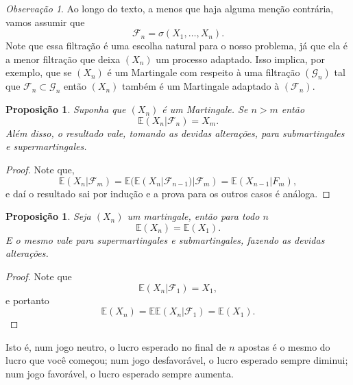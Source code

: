 \documentclass[12pt,a4paper,oneside]{book}
\newtheorem{proposition}[theorem]{Proposi\c{c}\~ao}
\theoremstyle{definition}
\theoremstyle{remark}
\newtheorem{remark}[theorem]{Observa\c{c}\~ao}
\numberwithin{equation}{section}
\newcommand{\E}{\mathbb{E}}
\newcommand{\F}{\mathcal{F}}
\begin{document}
\begin{tcolorbox}[colback= yellow!60]
\begin{remark}
Ao longo do texto, a menos que haja alguma menção contrária, vamos assumir que 
$$\mathcal{F}_n = \sigma(X_1,\dots,X_n).$$
Note que essa filtração é uma escolha natural para o nosso problema, já que ela é a menor filtração que deixa $(X_n)$ um processo adaptado.
Isso implica, por exemplo,  que se $(X_n)$ é  um Martingale com respeito à uma filtração $(\mathcal{G}_n)$ tal que $\mathcal{F}_n\subset \mathcal{G}_n$ então $(X_n)$ também é um Martingale adaptado à $(\mathcal{F}_n)$.


\end{remark}

\end{tcolorbox}













\begin{proposition}
Suponha que $(X_n)$ é um Martingale. Se $n>m$ então 
$$\E(X_n|\mathcal{F}_n) = X_m. $$
Além disso, o resultado vale, tomando as devidas alterações, para submartingales e supermartingales.
\end{proposition}
\begin{proof}
Note que,
$$\E(X_n|\F_m) = \E(\E(X_n|\F_{n-1})|\F_m) = \E(X_{n-1}|F_m), $$
e daí o resultado sai por indução e a prova para os outros casos é análoga.
\end{proof}

\begin{proposition}
Seja $(X_n)$ um martingale, então para todo $n$
$$\E(X_n) = \E(X_1). $$
E o mesmo vale para supermartingales e submartingales, fazendo as devidas alterações.
\end{proposition}
\begin{proof}
Note que
$$\E(X_{n}|\F_1) = X_1, $$
e portanto
$$\E(X_n) = \E\E(X_{n}|\F_1) = \E(X_1). $$
\end{proof}

\begin{tcolorbox}[colback=yellow!60]
Isto é, num jogo neutro, o lucro esperado no final de $n$ apostas é o mesmo do lucro que você começou; num jogo desfavorável, o lucro esperado sempre diminui; num jogo favorável, o lucro esperado sempre aumenta. 
\end{tcolorbox}
\end{document}

